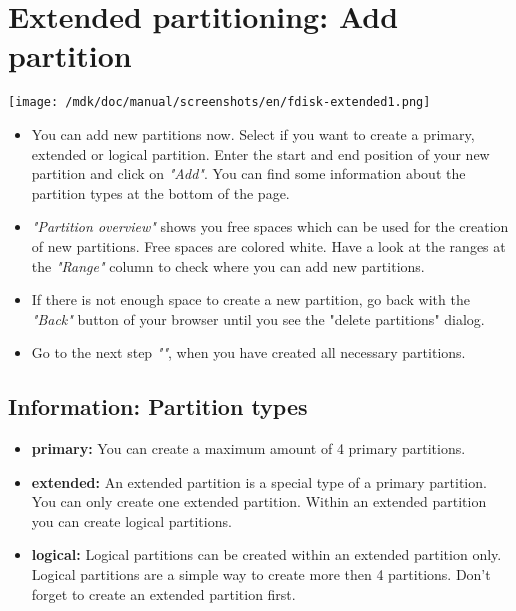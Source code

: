 \section{Extended partitioning: Add partition}
\texttt{[image: /mdk/doc/manual/screenshots/en/fdisk-extended1.png]} \\
\begin{itemize}
\item You can add new partitions now. Select if you want to create a primary, extended or logical partition. Enter the start and end position of your new partition and click on \textit{"Add"}. You can find some information about the partition types at the bottom of the page.\\
\item \textit{"Partition overview"} shows you free spaces which can be used for the creation of new partitions. Free spaces are colored white. Have a look at the ranges at the \textit{"Range"} column to check where you can add new partitions.\\
\item If there is not enough space to create a new partition, go back with the \textit{"Back"} button of your browser until you see the "delete partitions" dialog.\\
\item Go to the next step \textit{""}, when you have created all necessary partitions.\\
\end{itemize}
\subsection{Information: Partition types}
\begin{itemize}
 \item \textbf{primary:} You can create a maximum amount of 4 primary partitions.\\
 \item \textbf{extended:} An extended partition is a special type of a primary partition. You can only create one extended partition. Within an extended partition you can create logical partitions.\\
 \item \textbf{logical:} Logical partitions can be created within an extended partition only. Logical partitions are a simple way to create more then 4 partitions. Don't forget to create an extended partition first.\\
\end{itemize}
